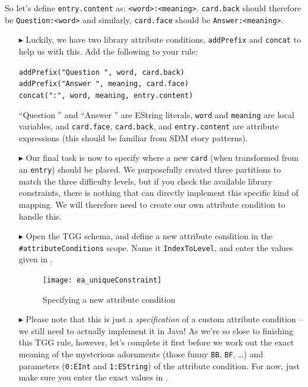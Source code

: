 So let's define \texttt{entry\-.cont\-ent} as: \texttt{<word>:<mean\-ing>}. 
\texttt{card\-.back} should therefore be \texttt{Quest\-ion:<word>} and similarly, \texttt{card\-.face} should be \texttt{Ans\-wer:<mean\-ing>}. 

\begin{enumerate}
\item[$\blacktriangleright$] Luckily, we have two library attribute conditions, \texttt{addPrefix} and \texttt{concat} to help us with this.
Add the following to your rule:

\verb|addPrefix("Question ", word, card.back)|\\  
\verb|addPrefix("Answer ", meaning, card.face)|\\
\verb|concat(":", word, meaning, entry.content)|

``Question '' and ``Answer '' are EString literals, \texttt{word} and
\texttt{meaning} are local variables, and \texttt{card.face}, \texttt{card.back}, and \texttt{entry.content} are attribute expressions (this should be familiar from SDM story patterns).

\item[$\blacktriangleright$] Our final task is now to specify where a new \texttt{card} (when transformed from an \texttt{entry}) should be placed.  
We purposefully created three partitions to match the three difficulty levels, but if you check the available library constraints, there is nothing that can directly implement this specific kind of mapping. 
We will therefore need to create our own attribute condition to handle this.

\item[$\blacktriangleright$] Open the TGG schema, and define a new attribute condition in the \texttt{\#attributeConditions} scope. 
Name it \texttt{IndexToLevel}, and enter the values given in .

\begin{figure}[htbp]
\begin{center}
  \texttt{[image: ea\_uniqueConstraint]}
  \caption{Specifying a new attribute condition}
  \label{ea:create_new_constraint}
\end{center}
\end{figure}
\FloatBarrier

\item[$\blacktriangleright$] Please note that this is just a \emph{specification} of a custom attribute condition -- we still need to actually implement it in Java! 
As we're so close to finishing this TGG rule, however, let's complete it first before we work out the exact meaning of the mysterious adornments (those funny \texttt{BB}, \texttt{BF}, \dots) and parameters (\texttt{0:EInt} and \texttt{1:EString}) of the attribute condition. 
For now, just make sure you enter the exact values in . 


\end{enumerate}
